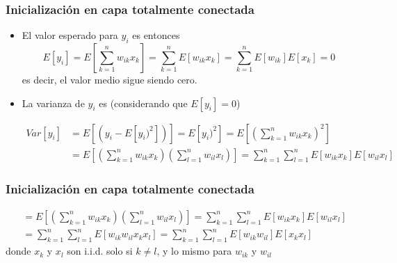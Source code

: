 \documentclass[svgnames,12pt,aspectratio=149]{beamer}
\begin{document}
\begin{frame}
  \frametitle{Inicialización en capa totalmente conectada}
\begin{itemize}
\item El valor esperado para $y_i$ es entonces 
\begin{equation*}
E\left[ y_{i}  \right] =E\left[ \sum_{k=1}^{n}{ w_{ik}x_{k} } \right]= \sum_{k=1}^{n}{ E\left[w_{ik}x_{k} \right]}=\sum_{k=1}^{n}{ E\left[w_{ik}\right]  E\left[x_{k} \right]}=0
\end{equation*}
es decir, el valor medio sigue siendo cero. 


\item La varianza de $y_i$ es (considerando que $E\left[ y_{i}  \right] =0$) 

\begin{equation*}
\begin{split}
Var\left[ y_{i} \right] & = E \left[ (y_{i}- E\left[ y_{i})^2 \right] )  \right]=E\left[ y_{i})^2\right]=E \left[ \left( \sum_{k=1}^{n}{ w_{ik}x_{k} }\right)^2   \right] \\
&=  E \left[ \left( \sum_{k=1}^{n}{ w_{ik}x_{k} }\right) \left( \sum_{l=1}^{n}{ w_{il}x_{l} }\right) \right]=   \sum_{k=1}^{n}\sum_{l=1}^{n} E \left[{ w_{ik}x_{k} } \right]  E \left[w_{il}x_{l}  \right]
\end{split}
\end{equation*}

\end{itemize}
\end{frame}
\begin{frame}
  \frametitle{Inicialización en capa totalmente conectada}


\begin{equation*}
\begin{split}
&=  E \left[ \left( \sum_{k=1}^{n}{ w_{ik}x_{k} }\right) \left( \sum_{l=1}^{n}{ w_{il}x_{l} }\right) \right]=   \sum_{k=1}^{n}\sum_{l=1}^{n} E \left[{ w_{ik}x_{k} } \right]  E \left[w_{il}x_{l}  \right]\\
&=  \sum_{k=1}^{n}\sum_{l=1}^{n}E \left[w_{ik}w_{il}x_{k}x_{l}\right]=\sum_{k=1}^{n}\sum_{l=1}^{n} E \left[w_{ik}w_{il}\right]E \left[x_{k}x_{l}\right]
\end{split}
\end{equation*}
donde $x_k$ y $x_l$ son i.i.d. solo si $k\neq l$, y lo mismo para $w_{ik}$ y $w_{il}$ 

\end{frame}
\end{document}
